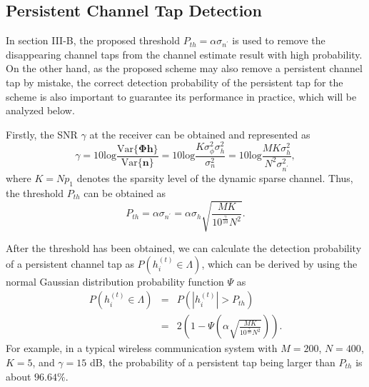 \documentclass[conference]{IEEEtran}
\begin{document}
\subsection{Persistent Channel Tap Detection}
In section III-B, the proposed threshold $P_{th}=\alpha\sigma_{n^{'}}$ is used to remove the disappearing channel taps from the channel estimate result with high probability.
On the other hand, as the proposed scheme may also remove a persistent channel tap by mistake, the correct detection probability of the persistent tap for the scheme is also important to guarantee its performance in practice, which will be analyzed below.

Firstly, the SNR $\gamma$ at the receiver can be obtained \cite{SNRDetection} and represented as
\begin{equation}
\label{SNR}
\gamma=10\text{log}\frac{\text{Var}\{\mathbf{\Phi}\mathbf{h}\}}{\text{Var}\{\mathbf{n}\}}=10\text{log}\frac{K\sigma_{\phi}^2\sigma_h^2}{\sigma_n^2}=10\text{log}\frac{M K\sigma_h^2}{N^2\sigma_{n^{'}}^2},
\end{equation}
where $K=N p_{1}$ denotes the sparsity level of the dynamic sparse channel. Thus, the threshold $P_{th}$ can be obtained as
\begin{equation}
P_{th}=\alpha\sigma_{n^{'}}=\alpha\sigma_h\sqrt{\frac{M K}{10^{\frac{\gamma}{10}}N^2}}.
\label{P_th}
\end{equation}

After the threshold has been obtained, we can calculate the detection probability of a persistent channel tap as $P(h_i^{(t)}\in \Lambda)$, which can be derived by using the normal Gaussian distribution probability function $\Psi$ as
\begin{eqnarray}
P(h_i^{(t)}\in \Lambda)&=&P(|h_i^{(t)}|>P_{th})\nonumber\\
&=&2\left(1-\Psi(\alpha\sqrt{\frac{M K}{10^{\frac{\gamma}{10}}N^2}})\right).
\label{theory_error}
\end{eqnarray}
For example, in a typical wireless communication system with $M=200$, $N=400$, $K=5$, and $\gamma=15$ dB, the probability of a persistent tap being larger than $P_{th}$ is about $96.64\%$.

\end{document}
